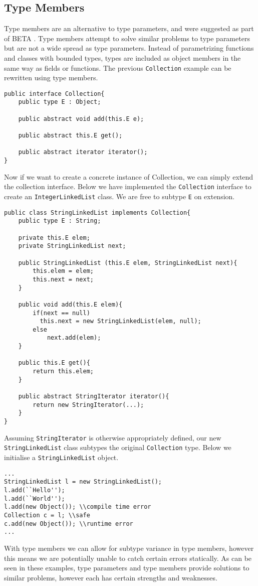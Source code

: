 \documentclass[11pt
              , a4paper
              , twoside
              , openright
              ]{report}
\numberwithin{case}{theorem}
\numberwithin{subcase}{case}
\begin{document}
\subsection{Type Members}
Type members are an alternative to type parameters, and were suggested as part of BETA \cite{Madsen:1989:VCP:74877.74919}. Type members attempt to solve similar problems to type parameters but are not a wide spread as type parameters. Instead of parametrizing functions and classes with bounded types, types are included as object members in the same way as fields or functions. The previous \verb|Collection| example can be rewritten using type members.
\begin{lstlisting}[mathescape, style=customlang]
public interface Collection{
	public type E : Object;

	public abstract void add(this.E e);
	
	public abstract this.E get();
	
	public abstract iterator iterator();
}
\end{lstlisting}
Now if we want to create a concrete instance of Collection, we can simply extend the collection interface. Below we have implemented the \verb|Collection| interface to create an \verb|IntegerLinkedList| class. We are free to subtype \verb|E| on extension.
\begin{lstlisting}[mathescape, style=customlang]
public class StringLinkedList implements Collection{
	public type E : String;

	private this.E elem;
	private StringLinkedList next;
	
	public StringLinkedList (this.E elem, StringLinkedList next){
		this.elem = elem;
		this.next = next;
	}
	
	public void add(this.E elem){
		if(next == null)
		  this.next = new StringLinkedList(elem, null);
		else
			next.add(elem);
	}
	
	public this.E get(){
		return this.elem;
	}
	
	public abstract StringIterator iterator(){
		return new StringIterator(...);
	}
}
\end{lstlisting}
Assuming \verb|StringIterator| is otherwise appropriately defined, our new \verb|StringLinkedList| class subtypes the original \verb|Collection| type. Below we initialise a \verb|StringLinkedList| object.
\begin{lstlisting}[mathescape, style=customlang]
...
StringLinkedList l = new StringLinkedList();
l.add(``Hello'');
l.add(``World'');
l.add(new Object()); \\compile time error
Collection c = l; \\safe
c.add(new Object()); \\runtime error
...
\end{lstlisting}
With type members we can allow for subtype variance in type members, however this means we are potentially unable to catch certain errors statically. As can be seen in these examples, type parameters and type members provide solutions to similar problems, however each has certain strengths and weaknesses.
\end{document}
